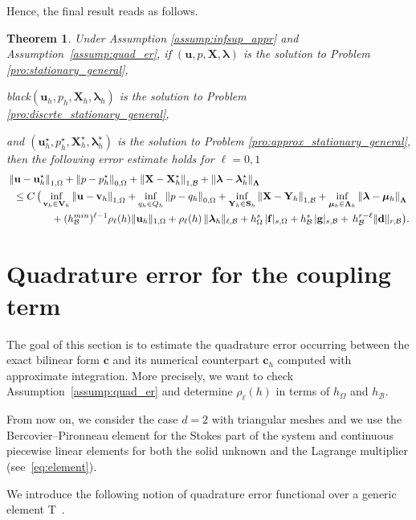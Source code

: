 \documentclass[oneside]{amsart} %
\newcommand{\norm}[1]{\left\lVert#1\right\rVert}
\newtheorem{teo}{Theorem}
\newcommand\B{\mathcal B} %
\renewcommand\u{\mathbf{u}} %
\renewcommand\v{\mathbf{v}} %
\renewcommand\d{\mathbf{d}} %
\renewcommand\c{\mathbf{c}} %
\newcommand\f{\mathbf{f}} %
\newcommand\g{\mathbf{g}} %
\renewcommand\S{\mathbf{S}} %
\newcommand\X{\mathbf{X}} %
\newcommand\Y{\mathbf{Y}} %
\newcommand\LL{{\boldsymbol{\Lambda}}} %
\newcommand\Vline{\mathbf{V}} %
\newcommand\Sline{\S} %
\newcommand\llambda{\boldsymbol\lambda} %
\newcommand\mmu{{\boldsymbol\mu}} %
\newcommand\tri{\mathrm{T}} %
\newcommand\DB{\begin{color}{black}}
\newcommand\BD{\end{color}}
\begin{document}
	Hence, the final result reads as follows.
	\begin{teo}\label{theo:strang}
		Under Assumption \ref{assump:infsup_appr} and
		Assumption~\ref{assump:quad_er}, if $(\u,p,\X,\llambda)$ is the solution to
		Problem \ref{pro:stationary_general}, \DB $(\u_h,p_h,\X_h,\llambda_h)$ is the solution to
		Problem \ref{pro:discrte_stationary_general}, \BD and
		$(\u_h^\star,p_h^\star,\X_h^\star,\llambda_h^\star)$ is the solution to
		Problem \ref{pro:approx_stationary_general}, then the following error estimate
		holds for $\ell=0,1$
		\begin{equation*}
			\begin{aligned}
				&\norm{\u-\u_h^\star}_{1,\Omega} + \norm{p-p_h^\star}_{0,\Omega} + \norm{\X-\X_h^\star}_{1,\B} + \norm{\llambda-\llambda_h^\star}_{\LL} \\
				&\hspace{0.2cm}\le C\,\big(\inf_{\v_h\in\Vline_h}\norm{\u-\v_h}_{1,\Omega} + \inf_{q_h\in Q_h}\norm{p-q_h}_{0,\Omega} + \inf_{\Y_h\in\Sline_h}\norm{\X-\Y_h}_{1,\B} + \inf_{\mmu_h\in\LL_h}\norm{\llambda-\mmu_h}_{\LL} \\
				&\hspace{1.5cm}+ (h_\B^{min})^{\ell-1}\rho_\ell(h)\|\u_h\|_{1,\Omega}+\rho_{\ell}(h)\,\|\llambda_h\|_{\ell,\B}
				+ h_\Omega^s\,|\f|_{s,\Omega} + h_\B^s\,|\g|_{s,\B} +\,
				h_\B^{r-\ell}\|\d\|_{r,\B}\big).
			\end{aligned}
		\end{equation*}
	\end{teo}
	
	\section{Quadrature error for the coupling term}\label{sec:quad_error}
	
	The goal of this section is to estimate the quadrature error occurring
	between the exact bilinear form $\c$ and its numerical counterpart $\c_h$
	computed with approximate integration. More precisely, we want to check
	Assumption~\ref{assump:quad_er} and determine $\rho_{\ell}(h)$ in terms of $h_\Omega$ and $h_\B$.
	
	From now on, we consider the case $d=2$ with triangular
	meshes and we use the Bercovier--Pironneau element for the Stokes part of the
	system and continuous piecewise linear elements for both the solid unknown and the Lagrange multiplier (see~\eqref{eq:element}).
	
	We introduce the following notion of quadrature error functional over a
	generic element $\tri$~\cite{ciarlet2002finite}.
	
\end{document}

